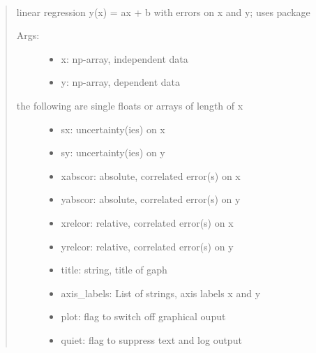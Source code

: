 \documentclass[letterpaper,10pt,english]{sphinxmanual}
\begin{document}
\begin{fulllineitems}
\label{\detokenize{index:PhyPraKit.PhyPraKit.kRegression}}~\begin{quote}

linear regression y(x) = ax + b  with errors on x and y;
uses package 
\begin{description}
\item[{Args:}] \leavevmode\begin{itemize}
\item {} 
x:  np-array, independent data

\item {} 
y:  np-array, dependent data

\end{itemize}

\item[{the following are single floats or arrays of length of x}] \leavevmode\begin{itemize}
\item {} 
sx: uncertainty(ies) on x

\item {} 
sy: uncertainty(ies) on y

\item {} 
xabscor: absolute, correlated error(s) on x

\item {} 
yabscor: absolute, correlated error(s) on y

\item {} 
xrelcor: relative, correlated error(s) on x

\item {} 
yrelcor: relative, correlated error(s) on y

\item {} 
title:   string, title of gaph

\item {} 
axis\_labels: List of strings, axis labels x and y

\item {} 
plot: flag to switch off graphical ouput

\item {} 
quiet: flag to suppress text and log output

\end{itemize}


\end{description}
\end{quote}
\end{fulllineitems}
\end{document}
